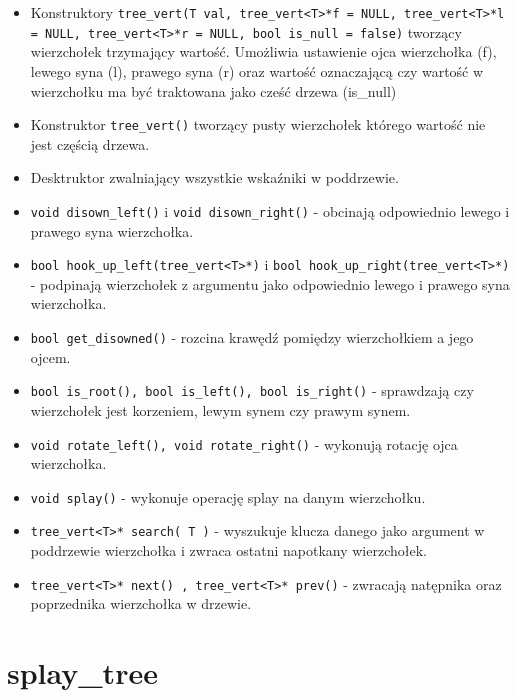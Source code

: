 \documentclass[declaration,shortabstract]{iithesis}
\theoremstyle{thm}
\theoremstyle{remark}
\theoremstyle{plain}
\theoremstyle{plain}
\theoremstyle{plain}
\begin{document}
\begin{itemize}

\item{Konstruktory \texttt{tree\_vert(T val, tree\_vert<T>*f = NULL, tree\_vert<T>*l = NULL, tree\_vert<T>*r = NULL, bool is\_null = false)} tworzący wierzchołek trzymający wartość. Umożliwia ustawienie ojca wierzchołka (f), lewego syna (l), prawego syna (r) oraz wartość oznaczającą czy wartość w wierzchołku ma być traktowana jako cześć drzewa (is\_null)}
\item{Konstruktor \texttt{tree\_vert()} tworzący pusty wierzchołek którego wartość nie jest częścią drzewa.}

\item{Desktruktor zwalniający wszystkie wskaźniki w poddrzewie.}

\item{\texttt{void disown\_left()} i \texttt{void disown\_right()} - obcinają odpowiednio lewego i prawego syna wierzchołka.}
    
\item{\texttt{bool hook\_up\_left(tree\_vert<T>*)} i \texttt{bool hook\_up\_right(tree\_vert<T>*)} - podpinają wierzchołek z argumentu jako odpowiednio lewego i prawego syna wierzchołka.}

\item{\texttt{bool get\_disowned()} - rozcina krawędź pomiędzy wierzchołkiem a jego ojcem.}

\item{\texttt{bool is\_root(), bool is\_left(),  bool is\_right()} - sprawdzają czy wierzchołek jest korzeniem, lewym synem czy prawym synem.}

\item{\texttt{void rotate\_left(), void rotate\_right()} - wykonują rotację ojca wierzchołka.}
    
\item{\texttt{void splay()} - wykonuje operację splay na danym wierzchołku.}
    
\item{\texttt{tree\_vert<T>* search( T )} - wyszukuje klucza danego jako argument w poddrzewie wierzchołka i zwraca ostatni napotkany wierzchołek.}
   
\item{\texttt{tree\_vert<T>* next() ,  tree\_vert<T>* prev()} - zwracają natępnika oraz poprzednika wierzchołka w drzewie.}
\end{itemize}

\section{splay\_tree}
\end{document}

